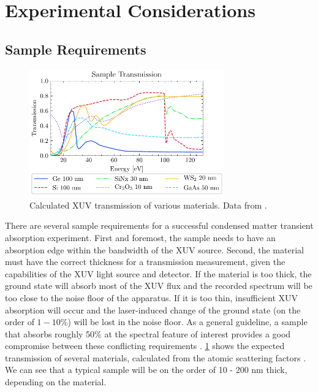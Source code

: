 \section{Experimental Considerations}

\subsection{Sample Requirements}

\begin{figure}
	\centering
	\includegraphics[width=0.75\textwidth]{figures/chap4/Sample_transmission_CXRO.pdf}
	\caption{Calculated XUV transmission of various materials. Data from \cite{gulliksonCXROXRayInteractions}.}
	\label{fig:Sample_trans_CXRO}
\end{figure}

There are several sample requirements for a successful condensed matter transient absorption experiment. First and foremost, the sample needs to have an absorption edge within the bandwidth of the XUV source. Second, the material must have the correct thickness for a transmission measurement, given the capabilities of the XUV light source and detector. If the material is too thick, the ground state will absorb most of the XUV flux and the recorded spectrum will be too close to the noise floor of the apparatus. If it is too thin, insufficient XUV absorption will occur and the laser-induced change of the ground state (on the order of $1-10\%$) will be lost in the noise floor. As a general guideline, a sample that absorbs roughly 50\% at the spectral feature of interest provides a good compromise between these conflicting requirements \cite{geneauxTransientAbsorptionSpectroscopy2019}. \cref{fig:Sample_trans_CXRO} shows the expected transmission of several materials, calculated from the atomic scattering factors \cite{gulliksonCXROXRayInteractions}. We can see that a typical sample will be on the order of 10 - 200 nm thick, depending on the material.

